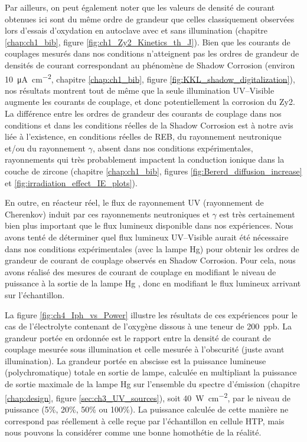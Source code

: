 \begin{refsection}
    Par ailleurs, on peut également noter que les valeurs de densité de courant obtenues ici sont du même ordre de grandeur
    que celles classiquement observées lors d’essais d’oxydation en autoclave avec et sans illumination (chapitre
    \ref{chap:ch1_bib}, figure \ref{fig:ch1_Zy2_Kinetics_th_J}).
    Bien que les courants de couplages mesurés dans nos conditions n’atteignent pas les ordres de grandeur de densités
    de courant correspondant au phénomène de Shadow Corrosion 
    (environ \SI{10}{\micro\ampere\per\square\centi\meter}, chapitre \ref{chap:ch1_bib}, figure \ref{fig:KKL_shadow_digitalization}), nos résultats
    montrent tout de même que la seule illumination UV--Visible augmente les courants de couplage, et donc potentiellement la
    corrosion du Zy2. La différence entre les ordres de grandeur des courants de couplage dans nos conditions et dans les
    conditions réelles de la Shadow Corrosion est à notre avis liée à l’existence, en conditions réelles de REB,
    du rayonnement neutronique et/ou du rayonnement $\gamma$, absent dans nos conditions expérimentales, rayonnements qui très
    probablement impactent la conduction ionique dans la couche de zircone (chapitre \ref{chap:ch1_bib}, figures \ref{fig:Bererd_diffusion_increase}
    et \ref{fig:irradiation_effect_IE_plots}).

    En outre, en réacteur réel, le flux de rayonnement UV (rayonnement de Cherenkov) induit par ces rayonnements
    neutroniques et $\gamma$ est très certainement bien plus important que le flux lumineux disponible dans nos expériences.  Nous
    avons tenté de déterminer quel flux lumineux UV--Visible aurait été nécessaire dans nos conditions expérimentales (avec
    la lampe Hg) pour obtenir les ordres de grandeur de courant de couplage observés en Shadow Corrosion. Pour cela, nous
    avons réalisé des mesures de courant de couplage en modifiant le niveau de puissance à la sortie de la lampe Hg , donc
    en modifiant le flux lumineux arrivant sur l’échantillon. 

    La figure \ref{fig:ch4_Iph_vs_Power} illustre les résultats de ces expériences pour le cas de l’électrolyte contenant de l’oxygène dissous à
    une teneur de 200~ppb. La grandeur portée en ordonnée est le rapport entre la densité de courant de couplage mesurée
    sous illumination et celle mesurée à l’obscurité (juste avant illumination). La grandeur portée en abscisse est la
    puissance lumineuse (polychromatique) totale en sortie de lampe, calculée en multipliant la puissance de sortie maximale
    de la lampe Hg sur l’ensemble du spectre d’émission (chapitre \ref{chap:design}, figure \ref{sec:ch3_UV_sources}), soit
    \SI{40}{\watt\per\square\centi\meter}, par le niveau de puissance
    (5\%, 20\%, 50\% ou 100\%). La puissance calculée de cette manière ne correspond pas réellement à celle reçue par
    l’échantillon en cellule HTP, mais nous pouvons la considérer comme une bonne homothétie de la
    réalité. 


\end{refsection}
